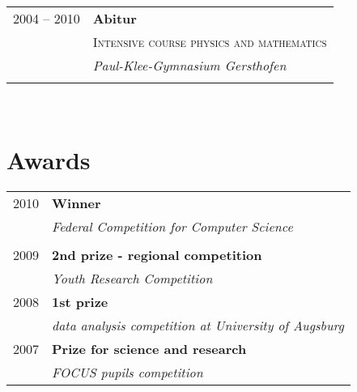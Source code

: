 \documentclass[a4paper,10pt]{article} %
\begin{document}
{\begin{minipage}[t]{0.44\textwidth}
\begin{tabular}{rl}
2004 -- 2010 & \textbf{Abitur}\\
& \textsc{Intensive course physics and mathematics} \\
& \textit{Paul-Klee-Gymnasium Gersthofen}\\
&\\


\end{tabular}\\[10pt]


\section{Awards}

\begin{tabular}{rl}
2010	 & \textbf{Winner}\\
& \textit{Federal Competition for Computer Science}\\ \\


2009	 & \textbf{2nd prize - regional competition}\\
& \textit{Youth Research Competition}\\[10pt]


2008	 & \textbf{1st prize}\\
& \textit{data analysis competition at University of Augsburg}\\[10pt]




2007	 & \textbf{Prize for science and research}\\
& \textit{FOCUS pupils competition}
\end{tabular}\\[10pt]


\end{minipage}}
\end{document}
